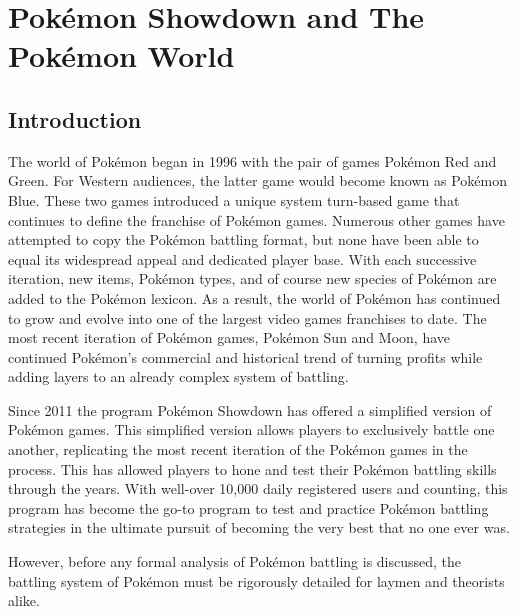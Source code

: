 \documentclass[12pt,twoside]{reedthesis}
\begin{document}
  \mainmatter %
  \pagestyle{fancyplain} %

  \chapter{Pokémon Showdown and The Pokémon
  World}\label{pokemon-showdown-and-the-pokemon-world}
  
  \section{Introduction}\label{introduction}
  
  The world of Pokémon began in 1996 with the pair of games Pokémon Red
  and Green. For Western audiences, the latter game would become known as
  Pokémon Blue. These two games introduced a unique system turn-based game
  that continues to define the franchise of Pokémon games. Numerous other
  games have attempted to copy the Pokémon battling format, but none have
  been able to equal its widespread appeal and dedicated player base. With
  each successive iteration, new items, Pokémon types, and of course new
  species of Pokémon are added to the Pokémon lexicon. As a result, the
  world of Pokémon has continued to grow and evolve into one of the
  largest video games franchises to date. The most recent iteration of
  Pokémon games, Pokémon Sun and Moon, have continued Pokémon's commercial
  and historical trend of turning profits while adding layers to an
  already complex system of battling.
  
  Since 2011 the program Pokémon Showdown has offered a simplified version
  of Pokémon games. This simplified version allows players to exclusively
  battle one another, replicating the most recent iteration of the Pokémon
  games in the process. This has allowed players to hone and test their
  Pokémon battling skills through the years. With well-over 10,000 daily
  registered users and counting, this program has become the go-to program
  to test and practice Pokémon battling strategies in the ultimate pursuit
  of becoming the very best that no one ever was.
  
  However, before any formal analysis of Pokémon battling is discussed,
  the battling system of Pokémon must be rigorously detailed for laymen
  and theorists alike.
  
\end{document}
